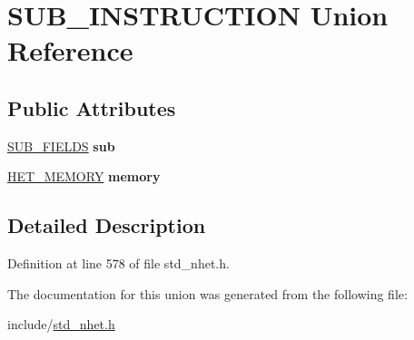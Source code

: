 \hypertarget{unionSUB__INSTRUCTION}{}\section{S\+U\+B\+\_\+\+I\+N\+S\+T\+R\+U\+C\+T\+I\+ON Union Reference}
\label{unionSUB__INSTRUCTION}
\subsection*{Public Attributes}
\begin{DoxyCompactItemize}
\item 
\mbox{\label{unionSUB__INSTRUCTION_a324ea43c874f499a3f195e8a27c9a45c}} 
\mbox{\hyperlink{structSUB__format}{S\+U\+B\+\_\+\+F\+I\+E\+L\+DS}} {\bfseries sub}
\item 
\mbox{\label{unionSUB__INSTRUCTION_aa165d7d63ba986c2030c7a3b34afcf64}} 
\mbox{\hyperlink{structmemory__format}{H\+E\+T\+\_\+\+M\+E\+M\+O\+RY}} {\bfseries memory}
\end{DoxyCompactItemize}


\subsection{Detailed Description}


Definition at line 578 of file std\+\_\+nhet.\+h.



The documentation for this union was generated from the following file\+:\begin{DoxyCompactItemize}
\item 
include/\mbox{\hyperlink{std__nhet_8h}{std\+\_\+nhet.\+h}}\end{DoxyCompactItemize}
